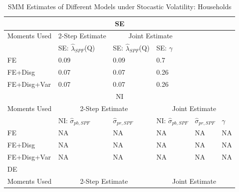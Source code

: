 \documentclass[12pt]{article}
\begin{document}
\begin{table}[p]
		\centering
		\caption{SMM Estimates of Different Models under Stocastic Volatility: Households}
	\label{SMM_Est_sv_SCE}
	\begin{tabular}{llllll}
			\hline 
		\multicolumn{6}{c}{SE}         \\
			\hline            
		Moments Used & 2-Step Estimate            & \multicolumn{2}{c}{Joint Estimate}                     &                       &          \\
			\hline 
		& SE: $\hat\lambda_{SPF}$(Q) & SE: $\hat\lambda_{SPF}$(Q) & SE: $\gamma$      
		        &                       &          \\
		        	\hline 
		FE           & 0.09                       & 0.09                       & 0.7                       &                       &          \\
		FE+Disg      & 0.07                       & 0.07                       & 0.26                      &                       &          \\
		FE+Disg+Var  & 0.07                       & 0.07                       & 0.26                      &                       &          \\
			\hline 
		\multicolumn{6}{c}{NI}                                                                                                                \\
			\hline 
		Moments Used & \multicolumn{2}{c}{2-Step Estimate}                     & \multicolumn{3}{c}{Joint Estimate}                           \\
			\hline 
		& NI: $\hat\sigma_{pb,SPF}$  & $\hat\sigma_{pr,SPF}$      & NI: $\hat\sigma_{pb,SPF}$ & $\hat\sigma_{pr,SPF}$ & $\gamma$ \\
			\hline 
		FE           & NA                         & NA                         & NA                        & NA                    & NA       \\
		FE+Disg      & NA                         & NA                         & NA                        & NA                    & NA       \\
		FE+Disg+Var  & NA                         & NA                         & NA                        & NA                    & NA       \\
			\hline 
		\multicolumn{6}{l}{DE}                                                                                                                \\
			\hline 
		Moments Used & \multicolumn{2}{c}{2-Step Estimate}                     & \multicolumn{3}{c}{Joint Estimate}                           \\

\end{tabular}
\end{table}
\end{document}
